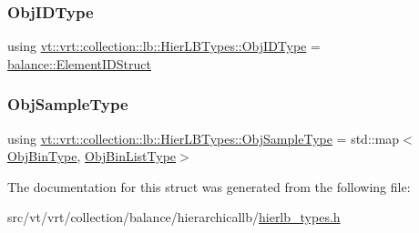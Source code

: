 \subsubsection{\texorpdfstring{Obj\+I\+D\+Type}{ObjIDType}}
{\footnotesize\ttfamily using \hyperlink{structvt_1_1vrt_1_1collection_1_1lb_1_1_hier_l_b_types_a9f71a6bbdc8603a2c58172521f82c5e2}{vt\+::vrt\+::collection\+::lb\+::\+Hier\+L\+B\+Types\+::\+Obj\+I\+D\+Type} =  \hyperlink{structvt_1_1vrt_1_1collection_1_1balance_1_1_element_i_d_struct}{balance\+::\+Element\+I\+D\+Struct}}

\mbox{\label{structvt_1_1vrt_1_1collection_1_1lb_1_1_hier_l_b_types_a597a60d517207b90e8c7984eac434e8f}} 
\subsubsection{\texorpdfstring{Obj\+Sample\+Type}{ObjSampleType}}
{\footnotesize\ttfamily using \hyperlink{structvt_1_1vrt_1_1collection_1_1lb_1_1_hier_l_b_types_a597a60d517207b90e8c7984eac434e8f}{vt\+::vrt\+::collection\+::lb\+::\+Hier\+L\+B\+Types\+::\+Obj\+Sample\+Type} =  std\+::map$<$\hyperlink{structvt_1_1vrt_1_1collection_1_1lb_1_1_hier_l_b_types_a280971a7971a7fc215214e81ba3b12b5}{Obj\+Bin\+Type}, \hyperlink{structvt_1_1vrt_1_1collection_1_1lb_1_1_hier_l_b_types_ac1e6fedb923b2a16f440a61e6dc94173}{Obj\+Bin\+List\+Type}$>$}



The documentation for this struct was generated from the following file\+:\begin{DoxyCompactItemize}
\item 
src/vt/vrt/collection/balance/hierarchicallb/\hyperlink{hierlb__types_8h}{hierlb\+\_\+types.\+h}\end{DoxyCompactItemize}
